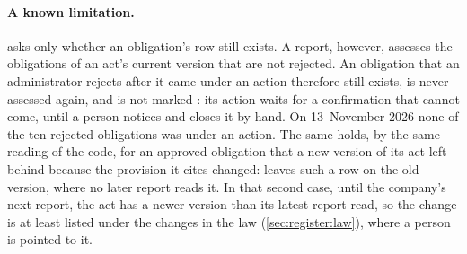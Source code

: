 \paragraph{A known limitation.}  asks only whether an obligation's row still
exists. A report, however, assesses the obligations of an act's current version that are not
rejected. An obligation that an administrator rejects after it came under an action therefore
still exists, is never assessed again, and is not marked : its action waits
for a confirmation that cannot come, until a person notices and closes it by hand. On
13~November 2026 none of the ten rejected obligations was under an action. The same holds, by
the same reading of the code, for an approved obligation that a new version of its act left
behind because the provision it cites changed:  leaves such a row on the
old version, where no later report reads it. In that second case, until the company's next
report, the act has a newer version than its latest report read, so the change is at least
listed under the changes in the law (\cref{sec:register:law}), where a person is pointed to it.
